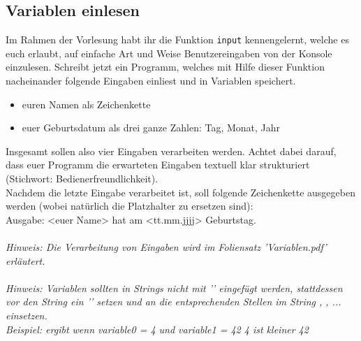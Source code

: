 \subsection{Variablen einlesen}
Im Rahmen der Vorlesung habt ihr die Funktion \texttt{input} kennengelernt, welche es euch erlaubt, auf einfache Art und Weise Benutzereingaben von der Konsole einzulesen. Schreibt jetzt ein Programm, welches mit Hilfe dieser Funktion nacheinander folgende Eingaben einliest und in Variablen speichert.
\begin{itemize}
    \item euren Namen als Zeichenkette
    \item euer Geburtsdatum als drei ganze Zahlen: Tag, Monat, Jahr
\end{itemize}
Insgesamt sollen also vier Eingaben verarbeiten werden. Achtet dabei darauf, dass euer Programm die erwarteten Eingaben textuell klar strukturiert (Stichwort: Bedienerfreundlichkeit).\\
Nachdem die letzte Eingabe verarbeitet ist, soll folgende Zeichenkette ausgegeben werden (wobei natürlich die Platzhalter zu ersetzen sind):\\
Ausgabe: {\ttfamily{\dq}}<euer Name> hat am <tt.mm.jjjj> Geburtstag.{\ttfamily{\dq}}\\
\\
\textit{Hinweis: Die Verarbeitung von Eingaben wird im Foliensatz 'Variablen.pdf' erläutert.}\\
\\
\textit{Hinweis: Variablen sollten in Strings nicht mit '\pythoninline{+}' eingefügt werden, stattdessen vor den String ein '' setzen und an die entsprechenden Stellen im String , , ... einsetzen. \\
Beispiel:  ergibt wenn variable0 = 4 und variable1 = 42 {\ttfamily{\dq}}4 ist kleiner 42{\ttfamily{\dq}}}\\
